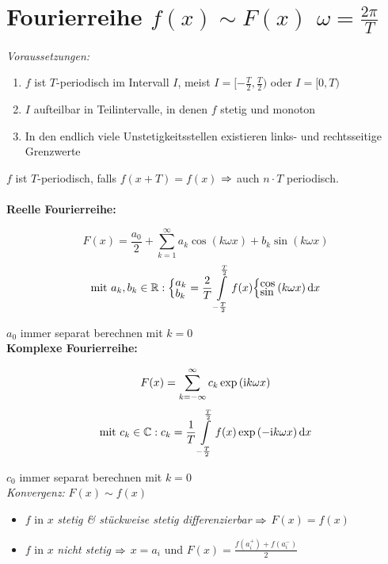 \documentclass[german,color,5pt]{latex4ei/latex4ei_fs}
\begin{document}
\section{Fourierreihe \quad $f(x) \sim F(x)$ \qquad $\omega = \frac{2 \pi}{T}$}
\begin{sectionbox}
	\emph{Voraussetzungen:}
	\begin{enumerate}
		\item $f$ ist $T$-periodisch im Intervall $I$, meist $I=[-\frac{T}{2},\frac{T}{2})$ oder $I=[0,T)$
		\item $I$ aufteilbar in Teilintervalle, in denen $f$ stetig und monoton
		\item In den endlich viele Unstetigkeitsstellen existieren links- und rechtsseitige Grenzwerte
	\end{enumerate}
	$f$ ist $T$-periodisch, falls $f(x+T) = f(x)$ $\Rightarrow$ auch $n \cdot T$ periodisch.\\\\
	\textbf{Reelle Fourierreihe:}
	\begin{emphbox}\vspace{-5pt}
		\[F(x) = \frac{a_0}{2} + \sum\limits_{k=1}^\infty a_k \cos \left(k \omega x \right) + b_k \sin \left( k \omega x \right)\]
		\[\text{mit } a_k,b_k \in \R:\Big\{ { ^{\textstyle a_k}_{\textstyle b_k}} = \frac{2}{T} \int\limits_{-\frac{T}{2}}^{\frac{T}{2}} f(x) \Big\{ {}^{\textstyle \cos} _{\textstyle \sin} \left(k \omega x \right) \diff x\]
	\end{emphbox}
	$a_0$ immer separat berechnen mit $k=0$\\
	\textbf{Komplexe Fourierreihe:}
	\begin{emphbox}\vspace{-5pt}
		\[F(x) = \sum\limits_{k=-\infty}^\infty c_k \exp \left( \mathrm{i} k \omega x \right)\]
		\[\text{mit } c_k \in \C: c_k = \frac{1}{T} \int\limits_{-\frac{T}{2}}^{\frac{T}{2}} f(x) \exp \left( - \i k \omega x \right) \diff x\]
	\end{emphbox}	
	$c_0$ immer separat berechnen mit $k=0$\\
	\emph{Konvergenz:} $F(x) \sim f(x)$
	\begin{itemize}
		\item $f$ in $x$ \emph{stetig \& stückweise stetig differenzierbar} $\Rightarrow$ $F(x) = f(x)$
		\item $f$ in $x$ \emph{nicht stetig} $\Rightarrow$ $x = a_i$ und $F(x) = \frac{f(a_i^+) + f(a_i^-)}{2}$
	\end{itemize}
\end{sectionbox}
\end{document}
